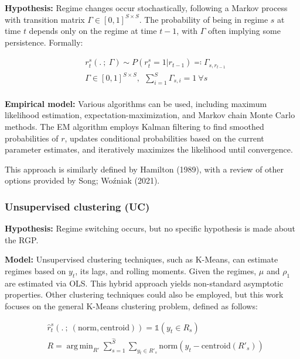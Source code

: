 \documentclass[
  letterpaper,
  DIV=11,
  numbers=noendperiod]{scrartcl}
\DeclareMathOperator*{\argmin}{arg\,min}
\numberwithin{equation}{section}
\numberwithin{table}{section}
\numberwithin{figure}{section}
\begin{document}
\textbf{Hypothesis:} Regime changes occur stochastically, following a
Markov process with transition matrix
\(\Gamma \in [0, 1]^{S \times S}\). The probability of being in regime
\(s\) at time \(t\) depends only on the regime at time \(t-1\), with
\(\Gamma\) often implying some persistence. Formally:

\begin{equation}
\begin{array}{ll}
    &r^s_t(. ~;~ \Gamma) \sim P(r^s_t = 1 | r_{t-1}) \eqqcolon \Gamma_{s, r_{t-1}}\\
    &\Gamma \in [0, 1]^{S \times S}, ~~ \sum_{i=1}^S \Gamma_{s, i} = 1 ~\forall s\\
\end{array}
\end{equation}

\textbf{Empirical model:} Various algorithms can be used, including
maximum likelihood estimation, expectation-maximization, and Markov
chain Monte Carlo methods. The EM algorithm employs Kalman filtering to
find smoothed probabilities of \(r\), updates conditional probabilities
based on the current parameter estimates, and iteratively maximizes the
likelihood until convergence.

This approach is similarly defined by Hamilton (1989), with a review of
other options provided by Song; Woźniak (2021).

\subsubsection{Unsupervised clustering
(UC)}\label{unsupervised-clustering-uc}

\textbf{Hypothesis:} Regime switching occurs, but no specific hypothesis
is made about the RGP.

\textbf{Model:} Unsupervised clustering techniques, such as K-Means, can
estimate regimes based on \(y_t\), its lags, and rolling moments. Given
the regimes, \(\mu\) and \(\rho_1\) are estimated via OLS. This hybrid
approach yields non-standard asymptotic properties. Other clustering
techniques could also be employed, but this work focuses on the general
K-Means clustering problem, defined as follows:

\begin{equation}
\begin{array}{ll}
    &\hat{r}^s_t(. ~;~ (\text{norm}, \text{centroid})) = \mathbb{1}(y_t \in R_s)\\
    &R = \argmin_{R'} \sum_{s=1}^{\hat{S}} \sum_{y_t \in R'_s} \text{norm}(y_t - \text{centroid}(R'_s))
\end{array}
\end{equation}
\end{document}
